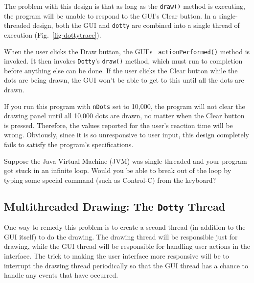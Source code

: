 The problem with this design is that as long as the {\tt draw()}
method is executing, the program will be unable to respond to
the GUI's Clear button.  In a single-threaded design, both the
GUI and {\tt dotty} are combined into a single thread of execution
(Fig.~\ref{fig-dottytrace}).
\begin{figure}[h!]
\end{figure}
When the user clicks the Draw button, the GUI's {\tt
actionPerformed()} method is invoked.  It then invokes {\tt Dotty}'s
{\tt draw()} method, which must run to completion before anything else
can be done.  If the user clicks the Clear button while the dots are
being drawn, the GUI won't be able to get to this until all the dots
are drawn.

If you run this program with {\tt nDots} set to 10,000, the program
will not clear the drawing panel until all 10,000 dots are drawn, no
matter when the Clear button is pressed.  Therefore, the values
reported for the user's reaction time will be wrong.   Obviously, since
it is so unresponsive to user input, this design completely fails to
satisfy the program's specifications.


\begin{SSTUDY}

\item  Suppose the Java Virtual Machine (JVM) was single threaded and your
program got stuck in an infinite loop.  Would you be able to break out
of the loop by typing some special command (such as Control-C) from
the keyboard?
\end{SSTUDY}

\subsection{Multithreaded Drawing: The {\tt Dotty} Thread}
\noindent One way to remedy this problem is to create a second thread (in
addition to the GUI itself) to do the drawing.  The drawing thread
will be responsible just for drawing, while the GUI thread will be
responsible for handling user actions in the interface.   The trick to
making the user interface more responsive will be to interrupt the
drawing thread periodically so that the GUI thread has a chance to
handle any events that have occurred.

